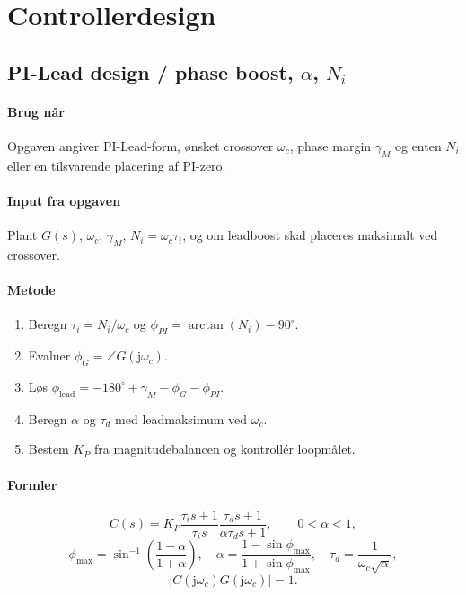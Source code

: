 \section{Controllerdesign}
\label{sec:pilead}

\subsection{PI-Lead design / phase boost, \(\alpha\), \(N_i\)}

\paragraph{Brug når}
Opgaven angiver PI-Lead-form, ønsket crossover \(\omega_c\), phase margin
\(\gamma_M\) og enten \(N_i\) eller en tilsvarende placering af PI-zero.

\paragraph{Input fra opgaven}
Plant \(G(s)\), \(\omega_c\), \(\gamma_M\), \(N_i=\omega_c\tau_i\), og om leadboost
skal placeres maksimalt ved crossover.

\paragraph{Metode}
\begin{enumerate}
\item Beregn \(\tau_i=N_i/\omega_c\) og \(\phi_{PI}=\arctan(N_i)-90^\circ\).
\item Evaluer \(\phi_G=\angle G(\mathrm{j}\omega_c)\).
\item Løs \(\phi_{\mathrm{lead}}=-180^\circ+\gamma_M-\phi_G-\phi_{PI}\).
\item Beregn \(\alpha\) og \(\tau_d\) med leadmaksimum ved \(\omega_c\).
\item Bestem \(K_P\) fra magnitudebalancen og kontrollér loopmålet.
\end{enumerate}

\paragraph{Formler}
\[
C(s)=K_P\frac{\tau_i s+1}{\tau_i s}
          \frac{\tau_d s+1}{\alpha\tau_d s+1},\qquad 0<\alpha<1,
\]
\[
\phi_{\max}=\sin^{-1}\!\left(\frac{1-\alpha}{1+\alpha}\right),\quad
\alpha=\frac{1-\sin\phi_{\max}}{1+\sin\phi_{\max}},\quad
\tau_d=\frac1{\omega_c\sqrt{\alpha}},
\]
\[
\left|C(\mathrm{j}\omega_c)G(\mathrm{j}\omega_c)\right|=1 .
\]

